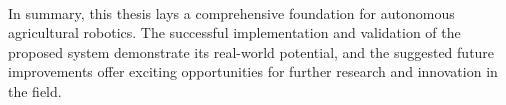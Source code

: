 \paragraph{}In summary, this thesis lays a comprehensive foundation for autonomous agricultural robotics. The successful implementation and validation of the proposed system demonstrate its real-world potential, and the suggested future improvements offer exciting opportunities for further research and innovation in the field.

